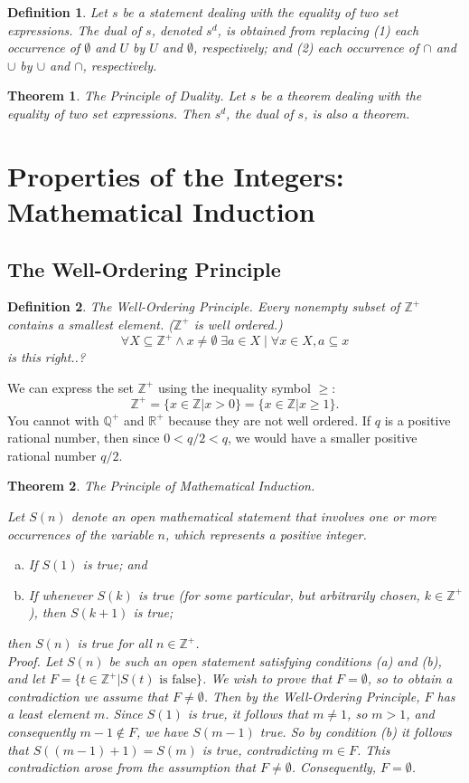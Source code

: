 \documentclass[12pt]{article}
\newtheorem{definition}{Definition} [section]
\newtheorem{theorem}{Theorem} [section]
\begin{document}
\begin{definition}
\emph{Let $s$ be a statement dealing with the equality of two set expressions. The }dual \emph{of $s$, denoted $s^d$, is obtained from replacing (1) each occurrence of $\emptyset$ and $U$ by $U$ and $\emptyset$, respectively; and (2) each occurrence of $\cap$ and $\cup$ by $\cup$ and $\cap$, respectively.}
\end{definition}
\begin{theorem}
The Principle of Duality. \emph{Let $s$ be a theorem dealing with the equality of two set expressions. Then $s^d$, the dual of $s$, is also a theorem.}
\end{theorem}
\section{Properties of the Integers: Mathematical Induction}
\subsection{The Well-Ordering Principle}
\begin{definition}The Well-Ordering Principle. \emph{Every }nonempty \emph{subset of $\mathbb{Z}^+$ contains a smallest element. ($\mathbb{Z}^+$ is} well ordered.)
\[\forall X \subseteq \mathbb{Z}^+ \wedge x \neq \emptyset \; \exists a \in X \; |\; \forall x \in X, a \subseteq x\]
is this right..?
\end{definition}
We can express the set $\mathbb{Z}^+$ using the inequality symbol $\geq$:
\[\mathbb{Z}^+ = \{x \in \mathbb{Z} | x > 0\} = \{x \in \mathbb{Z} | x \geq 1\}.\]
You cannot with $\mathbb{Q}^+$ and $\mathbb{R}^+$ because they are not well ordered. If $q$ is a positive rational number, then since $0 < q/2 < q$, we would have a smaller positive rational number $q/2$.
\begin{theorem}The Principle of Mathematical Induction. \begin{em}Let $S(n)$ denote an open mathematical statement that involves one or more occurrences of the variable $n$, which represents a positive integer.
\begin{enumerate} [(a)]
\item If $S(1)$ is true; and
\item If whenever $S(k)$ is true (for some particular, but arbitrarily chosen, $k \in \mathbb{Z}^+$), then $S(k+1)$ is true;
\end{enumerate}
then $S(n)$ is true for all $n \in \mathbb{Z}^+$.\\
\emph{Proof.} Let $S(n)$ be such an open statement satisfying conditions (a) and (b), and let $F = \{t \in \mathbb{Z}^+ | S(t) \text{ is false}\}$. We wish to prove that $F=\emptyset$, so to obtain a contradiction we assume that $F\neq\emptyset$. Then by the Well-Ordering Principle, $F$ has a least element $m$. Since $S(1)$ is true, it follows that $m \neq 1$, so $m > 1$, and consequently $m - 1 \notin F$, we have $S(m-1)$ true. So by condition (b) it follows that $S((m-1)+1) = S(m)$ is true, contradicting $m \in F$. This contradiction arose from the assumption that $F \neq \emptyset$. Consequently, $F = \emptyset$.
\end{em}
\end{theorem}
\end{document}
